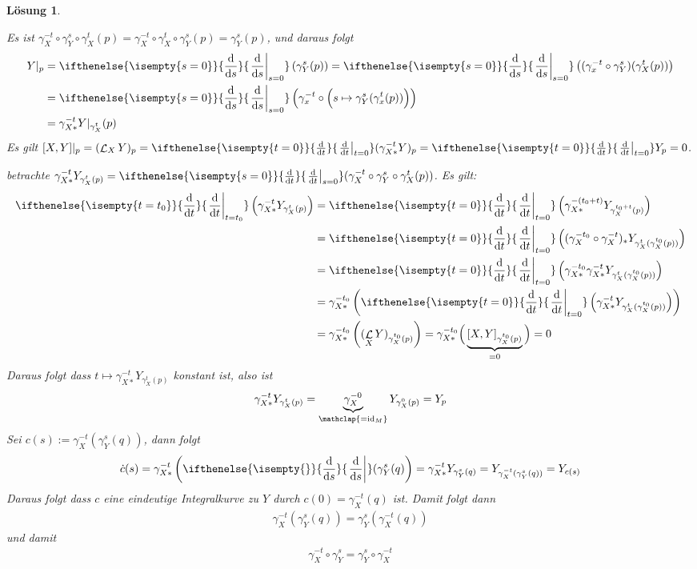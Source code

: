 \documentclass[paper=A4, twoside, chapterprefix=true, bibliography=totoc, headsepline]{scrbook}
\DeclareMathOperator{\calL}{\mathcal{L}}
\DeclareMathOperator{\id}{id} %
\newcommand{\dop}{\mathrm{d}}
\newcommand{\difffrac}[3][]{\ifthenelse{\isempty{#1}}{\frac{\dop #2}{\dop #3}}{\left. \frac{\dop #2}{\dop #3} \right|_{#1}}}
\theoremstyle{plain}
\theoremstyle{nonumberplain}
\theoremstyle{empty}
\theoremstyle{break}
\newtheorem{Loes}{L\"osung}
\begin{document}
\begin{Loes}
\begin{description}[leftmargin=*]
\item[(ii) $\bm{\Rightarrow}$ (i):]
	Es ist $\gamma_X^{-t} \circ \gamma_Y^s \circ \gamma_X^t (p) = \gamma_X^{-t} \circ \gamma_X^t \circ \gamma_Y^s (p) = \gamma_Y^s (p)$, und daraus folgt
	\begin{align*}
		Y|_p &= \difffrac[s=0]{}{s} \left( \gamma_Y^s(p) \right) = \difffrac[s=0]{}{s} \left( (\gamma_x^{-t} \circ \gamma_Y^s) (\gamma_X^t (p) ) \right) \\
		&= \difffrac[s=0]{}{s} \left( \gamma_x^{-t} \circ \Big( s \mapsto \gamma_Y^s (\gamma_x^t (p)) \Big) \right) \\
		&= \gamma_{X*}^{-t} Y|_{\gamma_X^t} (p)
	\end{align*}
	Es gilt $[X,Y]|_p = (\calL_X Y)_p = \difffrac[t=0]{}{t} (\gamma_{X*}^{-t} Y)_p = \difffrac[t=0]{}{t} Y_p = 0$.
\item[(i) $\bm{\Rightarrow}$ (ii):]
	betrachte $\gamma_{X*}^{-t} Y_{\gamma_{X}^{t}(p)} = \difffrac[s=0]{}{t} (\gamma_X^{-t} \circ \gamma_Y^s \circ \gamma_X^t (p))$. Es gilt:
	\begin{align*}
		\difffrac[t=t_0]{}{t} \left( \gamma_{X*}^{-t} Y_{\gamma_X^t(p)} \right) &= \difffrac[t=0]{}{t} \left( \gamma_{X*}^{-(t_0 + t)} Y_{\gamma_X^{t_0+t}(p)} \right) \\
		&= \difffrac[t=0]{}{t} \left( (\gamma_X^{-t_0} \circ \gamma_X^{-t})_* Y_{\gamma_X^t(\gamma_X^{t_0}(p))} \right) \\
		&= \difffrac[t=0]{}{t} \left( \gamma_{X*}^{-t_0} \gamma_{X*}^{-t} Y_{\gamma_X^t(\gamma_X^{t_0}(p))} \right) \\
		&= \gamma_{X*}^{-t_0} \left( \difffrac[t=0]{}{t} \left( \gamma_{X*}^{-t} Y_{\gamma_X^t(\gamma_X^{t_0}(p))} \right) \right) \\
		&= \gamma_{X*}^{-t_0} \left( (\calL_X Y)_{\gamma_X^{t_0}(p)} \right) = \gamma_{X*}^{-t_0} \Big( \underbrace{[X,Y]_{\gamma_X^{t_0}(p)}}_{=0} \Big) = 0
	\end{align*}
	Daraus folgt dass $t \mapsto \gamma_{X*}^{-t} Y_{\gamma_X^t(p)}$ konstant ist, also ist
	\begin{align*}
		\gamma_{X*}^{-t} Y_{\gamma_X^t(p)} = \underbrace{\gamma_X^{-0}}_{\mathclap{=\id_M}} Y_{\gamma_X^0(p)} = Y_p
	\end{align*}
	Sei $c(s) := \gamma_X^{-t}(\gamma_Y^s(q))$, dann folgt
	\begin{align*}
		\dot{c}(s) = \gamma_{X*}^{-t} \left( \difffrac{}{s} (\gamma_Y^s(q) \right) 
		= \gamma_{X*}^{-t} Y_{\gamma_{Y}^{s}(q)} = Y_{\gamma_{X}^{-t}(\gamma_Y^s(q))} = Y_{c(s)}
	\end{align*}
	Daraus folgt dass $c$ eine eindeutige Integralkurve zu $Y$ durch $c(0) = \gamma_X^{-t}(q)$ ist. Damit folgt dann
	\begin{align*}
		\gamma_X^{-t}(\gamma_Y^s(q)) = \gamma_Y^s(\gamma_X^{-t}(q))
	\end{align*}
	und damit
	\begin{align*}
		\gamma_X^{-t} \circ \gamma_Y^s = \gamma_Y^s \circ \gamma_X^{-t}
	\end{align*}
\end{description}
\end{Loes}
\end{document}
